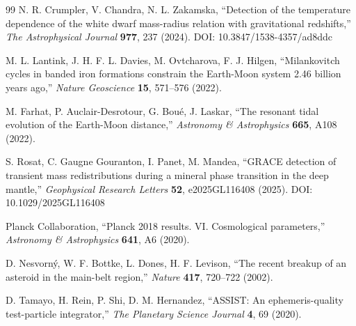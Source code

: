 \documentclass[11pt,a4paper]{article}
\begin{document}
\begin{thebibliography}{99}
		N. R. Crumpler, V. Chandra, N. L. Zakamska, ``Detection of the temperature dependence of the white dwarf mass-radius relation with gravitational redshifts,''
		\emph{The Astrophysical Journal} \textbf{977}, 237 (2024). DOI: 10.3847/1538-4357/ad8ddc
		
		M. L. Lantink, J. H. F. L. Davies, M. Ovtcharova, F. J. Hilgen, ``Milankovitch cycles in banded iron formations constrain the Earth-Moon system 2.46 billion years ago,''
		\emph{Nature Geoscience} \textbf{15}, 571–576 (2022).
		
		M. Farhat, P. Auclair-Desrotour, G. Boué, J. Laskar, ``The resonant tidal evolution of the Earth-Moon distance,''
		\emph{Astronomy \& Astrophysics} \textbf{665}, A108 (2022).
		
		S. Rosat, C. Gaugne Gouranton, I. Panet, M. Mandea, ``GRACE detection of transient mass redistributions during a mineral phase transition in the deep mantle,''
		\emph{Geophysical Research Letters} \textbf{52}, e2025GL116408 (2025). DOI: 10.1029/2025GL116408
		
		Planck Collaboration, ``Planck 2018 results. VI. Cosmological parameters,''
		\emph{Astronomy \& Astrophysics} \textbf{641}, A6 (2020).
		
		D. Nesvorný, W. F. Bottke, L. Dones, H. F. Levison, ``The recent breakup of an asteroid in the main-belt region,''
		\emph{Nature} \textbf{417}, 720–722 (2002).
		
		D. Tamayo, H. Rein, P. Shi, D. M. Hernandez, ``ASSIST: An ephemeris-quality test-particle integrator,''
		\emph{The Planetary Science Journal} \textbf{4}, 69 (2020).
		

\end{thebibliography}
\end{document}
